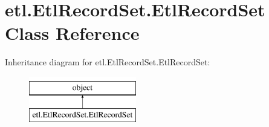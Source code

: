 \hypertarget{classetl_1_1EtlRecordSet_1_1EtlRecordSet}{\section{etl.\-Etl\-Record\-Set.\-Etl\-Record\-Set Class Reference}
\label{classetl_1_1EtlRecordSet_1_1EtlRecordSet}
}
Inheritance diagram for etl.\-Etl\-Record\-Set.\-Etl\-Record\-Set\-:\begin{figure}[H]
\begin{center}
\leavevmode
\includegraphics[height=2.000000cm]{classetl_1_1EtlRecordSet_1_1EtlRecordSet}
\end{center}
\end{figure}
